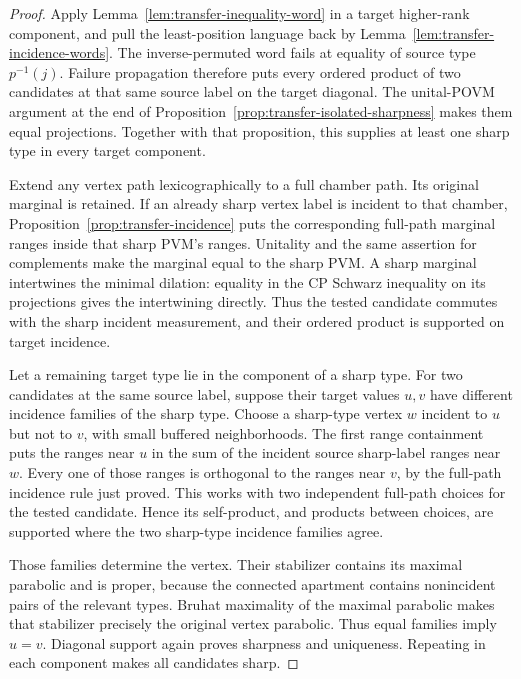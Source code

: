 \begin{proof}
Apply Lemma~\ref{lem:transfer-inequality-word} in a target higher-rank
component, and pull the least-position language back by
Lemma~\ref{lem:transfer-incidence-words}. The inverse-permuted word
fails at equality of source type $p^{-1}(j)$. Failure propagation
therefore puts every ordered product of two candidates at that same
source label on the target diagonal. The unital-POVM argument at the
end of Proposition~\ref{prop:transfer-isolated-sharpness} makes them
equal projections. Together with that proposition, this supplies at
least one sharp type in every target component.

Extend any vertex path lexicographically to a full chamber path. Its
original marginal is retained. If an already sharp vertex label is
incident to that chamber, Proposition~\ref{prop:transfer-incidence}
puts the corresponding full-path marginal ranges inside that sharp
PVM's ranges. Unitality and the same assertion for complements make
the marginal equal to the sharp PVM. A sharp marginal intertwines
the minimal dilation: equality in the CP Schwarz inequality on its
projections gives the intertwining directly. Thus the tested candidate
commutes with the sharp incident measurement, and their ordered
product is supported on target incidence.

Let a remaining target type lie in the component of a sharp type.
For two candidates at the same source label, suppose their target
values $u,v$ have different incidence families of the sharp type.
Choose a sharp-type vertex $w$ incident to $u$ but not to $v$, with
small buffered neighborhoods. The first range containment puts the
ranges near $u$ in the sum of the incident source sharp-label ranges
near $w$. Every one of those ranges is orthogonal to the ranges near
$v$, by the full-path incidence rule just proved. This works with
two independent full-path choices for the tested candidate. Hence
its self-product, and products between choices, are supported where
the two sharp-type incidence families agree.

Those families determine the vertex. Their stabilizer contains its
maximal parabolic and is proper, because the connected apartment
contains nonincident pairs of the relevant types. Bruhat maximality
of the maximal parabolic makes that stabilizer precisely the original
vertex parabolic. Thus equal families imply $u=v$. Diagonal support
again proves sharpness and uniqueness. Repeating in each component
makes all candidates sharp.


\end{proof}
